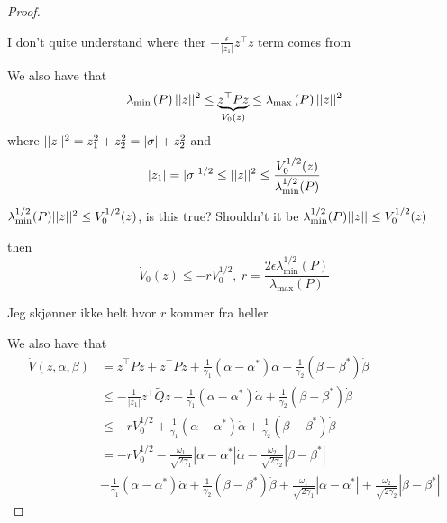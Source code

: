 \begin{proof}
        \begin{rmk}
            I don't quite understand where ther $- \frac{\epsilon}{|z_1|}z^\top z$ term comes from
        \end{rmk}
        We also have that  
        \begin{equation}
          \lambda_{\text{min}}\left(P\right)\lvert\lvert z\rvert\rvert^2 \leq \underbrace{z^\top P z}_{V_0(z)} \leq \lambda_{\text{max}}\left(P\right)\lvert\lvert z\rvert\rvert^2 
        \end{equation}
        where $\lvert\lvert z\rvert\rvert^2 = z_1^2 + z_2^2 = |\sigma| + z_2^2$ and
        \begin{equation}
          |z_1| = |\sigma|^{1/2} \leq \lvert\lvert z\rvert\rvert^2 \leq \frac{V_0^{1/2}(z)}{\lambda^{1/2}_{\text{min}}(P)}
        \end{equation}
        \begin{rmk}
            $\lambda^{1/2}_{\text{min}}(P)\lvert\lvert z\rvert\rvert^2 \leq V_0^{1/2}(z)$, is this true? Shouldn't it be $\lambda^{1/2}_{\text{min}}(P)\lvert\lvert z\rvert\rvert \leq V_0^{1/2}(z)$
        \end{rmk}
        then 
        \begin{equation}
          \dot{V}_0(z) \leq -rV_0^{1/2}, \ r=\frac{2\epsilon\lambda^{1/2}_{\text{min}}(P)}{\lambda_{\text{max}}(P)}
        \end{equation}
        \begin{rmk}
            Jeg skjønner ikke helt hvor $r$ kommer fra heller
        \end{rmk}
        We also have that  
        \begin{equation}
          \begin{split}
            \dot{V}(z, \alpha, \beta) &= \dot{z}^\top P z + z^\top P \dot{z} + \frac{1}{\gamma_1}\left(\alpha - \alpha^*\right)\dot{\alpha} + \frac{1}{\gamma_2} \left(\beta - \beta^*\right)\dot{\beta} \\
            &\leq -\frac{1}{|z_1|}z^\top\tilde{Q}z + \frac{1}{\gamma_1}\left(\alpha - \alpha^*\right)\dot{\alpha} + \frac{1}{\gamma_2} \left(\beta - \beta^*\right)\dot{\beta} \\
            &\leq -rV_0^{1/2} + \frac{1}{\gamma_1}\left(\alpha - \alpha^*\right)\dot{\alpha} + \frac{1}{\gamma_2} \left(\beta - \beta^*\right)\dot{\beta} \\
            &= -rV_0^{1/2} - \frac{\omega_1}{\sqrt{2\gamma_1}}\left|\alpha - \alpha^*\right|\dot{\alpha} - \frac{\omega_2}{\sqrt{2\gamma_2}} \left|\beta - \beta^*\right| \\
            &+ \frac{1}{\gamma_1}\left(\alpha - \alpha^*\right)\dot{\alpha} + \frac{1}{\gamma_2} \left(\beta - \beta^*\right)\dot{\beta} + \frac{\omega_1}{\sqrt{2\gamma_1}}\left|\alpha - \alpha^*\right| + \frac{\omega_2}{\sqrt{2\gamma_2}} \left|\beta - \beta^*\right|

\end{split}
\end{equation}
\end{proof}
